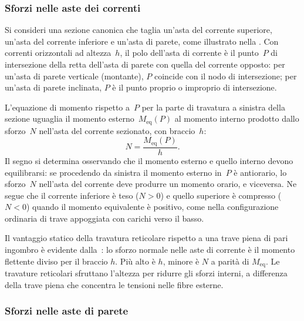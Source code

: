 \subsubsection{Sforzi nelle aste dei correnti}
\label{subsec:sforzi_correnti}

Si consideri una sezione canonica che taglia un'asta
del corrente superiore, un'asta del corrente inferiore
e un'asta di parete, come illustrato nella
. Con correnti orizzontali
ad altezza~$h$, il polo dell'asta di corrente è il
punto~$P$ di intersezione della retta dell'asta di
parete con quella del corrente opposto: per un'asta
di parete verticale (montante), $P$ coincide con il
nodo di intersezione; per un'asta di parete inclinata,
$P$ è il punto proprio o improprio di intersezione.

L'equazione di momento rispetto a~$P$ per la parte
di travatura a sinistra della sezione uguaglia il
momento esterno~$M_\text{eq}(P)$ al momento
interno prodotto dallo sforzo~$N$ nell'asta del
corrente sezionato, con braccio~$h$:
\begin{equation}\label{eq:N_corrente}
	N = \frac{M_\text{eq}(P)}{h}.
\end{equation}
Il segno si determina osservando che il momento
esterno e quello interno devono equilibrarsi: se
procedendo da sinistra il momento esterno in~$P$
è antiorario, lo sforzo~$N$ nell'asta del corrente
deve produrre un momento orario, e viceversa.
Ne segue che il corrente inferiore è teso
($N > 0$) e quello superiore è compresso ($N < 0$)
quando il momento equivalente è positivo,
come nella configurazione ordinaria di trave
appoggiata con carichi verso il basso.

\begin{oss}
	Il vantaggio statico della travatura reticolare
	rispetto a una trave piena di pari ingombro è
	evidente dalla~: lo sforzo
	normale nelle aste di corrente è il momento
	flettente diviso per il braccio $h$. Più alto
	è $h$, minore è $N$ a parità di $M_\text{eq}$.
	Le travature reticolari sfruttano l'altezza
	per ridurre gli sforzi interni, a differenza
	della trave piena che concentra le tensioni
	nelle fibre esterne.
\end{oss}


\subsubsection{Sforzi nelle aste di parete}
\label{subsec:sforzi_parete}

